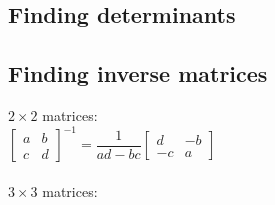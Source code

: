 	\subsection{Finding determinants}
\subsection{Finding inverse matrices}
$2\times2$ matrices:\\
$\begin{bmatrix}
	a & b\\c & d
\end{bmatrix}^{-1}=\dfrac{1}{ad-bc}\begin{bmatrix}
	d & -b\\-c & a
\end{bmatrix}$ \\ \\
$3\times3$ matrices:

\pagebreak

